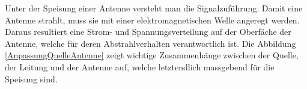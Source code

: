 Unter der Speisung einer Antenne versteht man die Signalzuführung. Damit eine Antenne strahlt, muss sie mit einer elektromagnetischen Welle angeregt werden. Daraus resultiert eine Strom- und Spannungsverteilung auf der Oberfäche der Antenne, welche für deren Abstrahlverhalten verantwortlich ist. Die Abbildung \ref{AnpassungQuelleAntenne} zeigt wichtige Zusammenhänge zwischen der Quelle, der Leitung und der Antenne auf, welche letztendlich massgebend für die Speisung sind.



